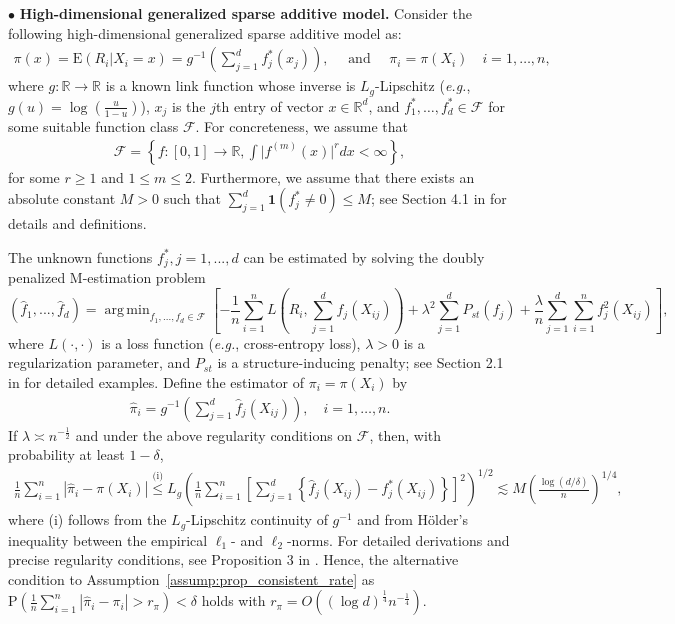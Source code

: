\documentclass[ejsv2,noshowframe]{imsart}
\theoremstyle{plain}
\theoremstyle{definition}
\theoremstyle{remark}
\DeclareMathOperator*{\argmin}{arg\,min}
\renewcommand{\hat}{\widehat}
\begin{document}
$\bullet$ \textbf{High-dimensional generalized sparse additive model.} 
Consider the following high-dimensional generalized sparse additive model as:
\begin{align*}
	\pi(x) = \mathrm{E}(R_i|X_i=x) = g^{-1} \left(\sum_{j=1}^d f_j^*\left(x_j\right) \right), \quad \text{ and } \quad \pi_i=\pi(X_i) \quad i = 1, \ldots, n,
\end{align*}
where $g:\mathbb{R}\to \mathbb{R}$ is a known link function whose inverse is $L_g$-Lipschitz (\emph{e.g.}, $g(u)=\log\left(\frac{u}{1-u}\right)$), $x_j$ is the $j$th entry of vector $x \in \mathbb{R}^d$, and $f_1^*, \ldots, f_d^* \in \mathcal{F}$ for some suitable function class $\mathcal{F}$. For concreteness, we assume that
\begin{align*}
	\mathcal{F} = \left\{ f: [0,1] \rightarrow \mathbb{R}, \int \big| f^{(m)}(x) \big|^r dx < \infty\right\},
\end{align*}
for some $r \geq 1$ and $1 \leq m \leq 2$. Furthermore, we assume that there exists an absolute constant $M > 0 $ such that $\sum_{j=1}^d \bm{1}(f_j^*\neq 0)\leq M$; see Section 4.1 in \cite{haris2022generalized} for details and definitions.

The unknown functions $f_j^*,j=1,...,d$ can be estimated by solving the doubly penalized M-estimation problem
\begin{equation*}
	\label{gsam}
	\left(\hat{f}_1,...,\hat{f}_d\right)=\argmin_{f_1,...,f_d\in \mathcal{F}}\left[-\frac{1}{n}\sum_{i=1}^n L\left(R_i,\sum_{j=1}^d f_j(X_{ij})\right) +\lambda^2 \sum_{j=1}^d P_{st}(f_j) + \frac{\lambda}{n}\sum_{j=1}^d \sum_{i=1}^n f_j^2(X_{ij})\right],
\end{equation*}
where $L(\cdot,\cdot)$ is a loss function (\emph{e.g.}, cross-entropy loss), $\lambda>0$ is a regularization parameter, and $P_{st}$ is a structure-inducing penalty; see Section 2.1 in \cite{haris2022generalized} for detailed examples. 
Define the estimator of $\pi_i = \pi(X_i)$ by
\begin{align*}
	\hat{\pi}_i = g^{-1}\left(\sum_{j=1}^d \hat{f}_j(X_{ij})\right), \quad i = 1, \ldots, n.
\end{align*}
If $\lambda \asymp n^{-\frac{1}{2}}$ and under the above regularity conditions on $\mathcal{F}$, then, with probability at least $1- \delta$,
\begin{align*}
	\frac{1}{n}\sum_{i=1}^n \left| \hat{\pi}_i - \pi(X_i) \right| \overset{\text{(i)}}{\leq} L_g \left(\frac{1}{n}\sum_{i=1}^n \left[\sum_{j=1}^d \left\{\hat{f}_j(X_{ij}) - f_j^*(X_{ij})\right\}\right]^2 \right)^{1/2} \lesssim M \left(\frac{\log (d/\delta)}{n} \right)^{1/4},
\end{align*}
where (i) follows from the $L_g$-Lipschitz continuity of $g^{-1}$ and from H{\"o}lder's inequality between the empirical $\ell_1$- and $\ell_2$-norms. For detailed derivations and precise regularity conditions, see Proposition 3 in \cite{tan2019doubly}.
Hence, the alternative condition to Assumption~\ref{assump:prop_consistent_rate} as $\mathrm{P}\left(\frac{1}{n}\sum_{i=1}^n \left|\hat{\pi}_i - \pi_i\right| > r_{\pi}\right) < \delta$ holds with $r_\pi = O\left( (\log d)^{\frac{1}{4}} n^{-\frac{1}{4}}\right)$.
\end{document}
